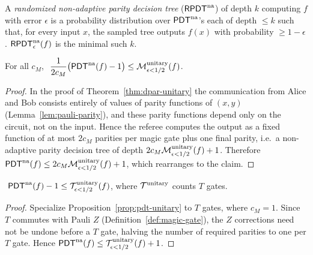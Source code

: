 \begin{definition}
  \label{def:rpdt}
  A \emph{randomized non-adaptive parity decision tree} ($\mathsf{RPDT}^{\mathrm{na}}$) of depth $k$
  computing $f$ with error $\epsilon$ is a probability distribution over
  $\mathsf{PDT}^{\mathrm{na}}$'s each of depth $\le k$ such that, for every input $x$, the sampled
  tree outputs $f(x)$ with probability $\ge 1-\epsilon$. $\mathsf{RPDT}^{\mathrm{na}}_\epsilon(f)$ is
  the minimal such $k$.
\end{definition}

\begin{proposition}
  \label{prop:pdt-unitary}
  For all $c_M$, $\ \dfrac{1}{2c_M}\big(\mathsf{PDT}^{\mathrm{na}}(f) - 1\big) \le
  \mathcal{M}^{\mathrm{unitary}}_{\epsilon<1/2}(f)$.
\end{proposition}
\begin{proof}
  In the proof of Theorem~\ref{thm:dpar-unitary} the communication from Alice and
  Bob consists entirely of values of parity functions of $(x,y)$
  (Lemma~\ref{lem:pauli-parity}), and these parity functions depend only on the
  circuit, not on the input. Hence the referee computes the output as a fixed
  function of at most $2c_M$ parities per magic gate plus one final parity, i.e.\
  a non-adaptive parity decision tree of depth $2c_M \mathcal{M}^{\mathrm{unitary}}_{\epsilon<1/2}(f) + 1$.
  Therefore $\mathsf{PDT}^{\mathrm{na}}(f) \le 2c_M\mathcal{M}^{\mathrm{unitary}}_{\epsilon<1/2}(f) + 1$, which rearranges to the
  claim.
\end{proof}

\begin{proposition}
  \label{prop:pdt-t}
  $\ \mathsf{PDT}^{\mathrm{na}}(f) - 1 \le \mathcal{T}^{\mathrm{unitary}}_{\epsilon<1/2}(f)$, where $\mathcal{T}^{\mathrm{unitary}}$ counts $T$ gates.
\end{proposition}
\begin{proof}
  Specialize Proposition~\ref{prop:pdt-unitary} to $T$ gates, where $c_M = 1$.
  Since $T$ commutes with Pauli $Z$ (Definition~\ref{def:magic-gate}), the $Z$
  corrections need not be undone before a $T$ gate, halving the number of required
  parities to one per $T$ gate. Hence $\mathsf{PDT}^{\mathrm{na}}(f) \le \mathcal{T}^{\mathrm{unitary}}_{\epsilon<1/2}(f) + 1$.
\end{proof}

